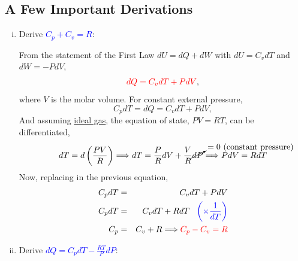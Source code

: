 \documentclass[12pts,a4paper,amsmath,amssymb,floatfix]{article}%
\newcommand{\frc}{\displaystyle\frac}
\newcommand{\red}{\textcolor{red}}
\newcommand{\blue}{\textcolor{blue}}
\begin{document}
\subsection{A Few Important Derivations}
  
   \begin{enumerate}[i)]
%
      \item Derive \blue{$C_{p}+C_{v}=R$}:

           From the statement of the First Law $dU = dQ + dW$ with $dU=C_{v}dT$ and $dW = -PdV$,
              \begin{equation}
                  \red{dQ = C_{v}dT + PdV},\label{Mod01_1Law_1}
              \end{equation}
           where $V$ is the molar volume. For constant external pressure,
              \begin{displaymath}
                  C_{p}dT = dQ = C_{v}dT + PdV,
              \end{displaymath}
           And assuming \underline{ideal gas}, the equation of state, $PV=RT$, can be differentiated,
              \begin{displaymath}
                  dT = d\left(\frc{P V}{R}\right) \Longrightarrow dT =\frc{P}{R}dV + \frc{V}{R}\cancelto{=0\text{ (constant pressure)}}{dP}  \Longrightarrow PdV = RdT
              \end{displaymath}
           Now, replacing in the previous equation,
              \begin{eqnarray}
                  C_{p}dT &=& C_{v}dT + PdV \nonumber \\
                  C_{p}dT &=& C_{v}dT + RdT \;\;\;\blue{\left(\times \frc{1}{dT}\right)} \nonumber\\
                  C_{p} &=& C_{v} + R \Longrightarrow \red{C_{p}-C_{v}=R}  \label{Mod01_1Law_CpCv}
              \end{eqnarray}
%
      \item Derive \blue{$dQ=C_{p}dT-\frc{RT}{P}dP$}:


\end{enumerate}
\end{document}
